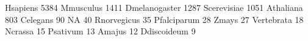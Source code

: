 \documentclass{article}
\renewenvironment{Schunk}{\vspace{\topsep}}{\vspace{\topsep}}
\begin{document}
\begin{Schunk}
\begin{Soutput}
                                                                     Hsapiens 
                                                                         5384 
                                                                    Mmusculus 
                                                                         1411 
                                                                Dmelanogaster 
                                                                         1287 
                                                                  Scerevisiae 
                                                                         1051 
                                                                    Athaliana 
                                                                          803 
                                                                     Celegans 
                                                                           90 
                                                                           NA 
                                                                           40 
                                                                  Rnorvegicus 
                                                                           35 
                                                                  Pfalciparum 
                                                                           28 
                                                                        Zmays 
                                                                           27 
                                                                   Vertebrata 
                                                                           18 
                                                                      Ncrassa 
                                                                           15 
                                                                     Psativum 
                                                                           13 
                                                                       Amajus 
                                                                           12 
                                                                  Ddiscoideum 
                                                                            9 

\end{Soutput}
\end{Schunk}
\end{document}
